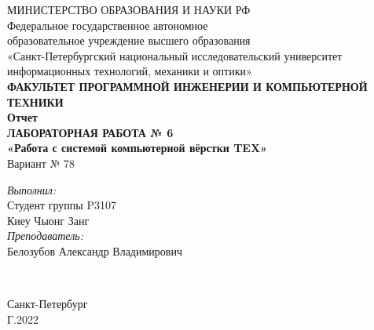 {\centering
МИНИСТЕРСТВО ОБРАЗОВАНИЯ И НАУКИ РФ \\
\vspace{0.6cm}
Федеральное государственное автономное \\
образовательное учреждение высшего образования \\
«Санкт-Петербургский национальный исследовательский университет \\
 информационных технологий, механики и оптики» \\
\vspace{0.6cm}
\footnotesize{\textbf{ФАКУЛЬТЕТ ПРОГРАММНОЙ ИНЖЕНЕРИИ И КОМПЬЮТЕРНОЙ ТЕХНИКИ}} \\
\vspace{3.2cm}
\Large{\textbf{Отчет}}\\
\Large{\textbf{ЛАБОРАТОРНАЯ РАБОТА № 6}} \\
\Large{\textbf{«Работа с системой компьютерной вёрстки TEX»}}\\

\vspace{1cm}
\Large{Вариант № 78} \\
\vspace{9cm}
\begin{minipage}{\linewidth}
\raggedleft
\large
\textit{Выполнил:} \\
Студент группы P3107 \\
Киеу Чыонг Занг\\
\textit{Преподаватель:} \\
Белозубов Александр Владимирович\\
\end{minipage} \\
\vspace{2cm}
\begin{minipage}{\linewidth}
\centering
\normalsize{Санкт-Петербург\\ Г.2022}
\end{minipage} \\}
